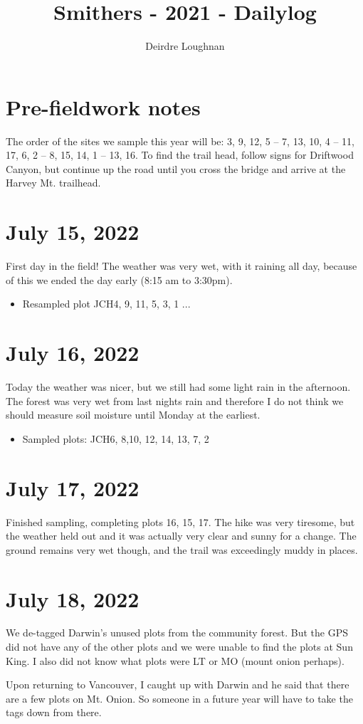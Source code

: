 \documentclass{article}\usepackage[]{graphicx}\usepackage[]{color}
\title{Smithers - 2021 - Dailylog}
\author{Deirdre Loughnan}
\begin{document}
\maketitle
\section{Pre-fieldwork notes}

The order of the sites we sample this year will be:  3,  9, 12, 5  -- 7, 13, 10,  4 -- 11, 17, 6, 2 --  8, 15, 14, 1 -- 13, 16. To find the trail head, follow signs for Driftwood Canyon, but continue up the road until you cross the bridge and arrive at the Harvey Mt. trailhead. 

\section{July 15, 2022}

First day in the field! The weather was very wet, with it raining all day, because of this we ended the day early (8:15 am to 3:30pm).

\begin{itemize}
\item Resampled plot JCH4, 9, 11, 5, 3, 1 ...
\end{itemize}
\section{July 16, 2022}

Today the weather was nicer, but we still had some light rain in the afternoon. The forest was very wet from last nights rain and therefore I do not think we should measure soil moisture until Monday at the earliest.

\begin{itemize}
\item Sampled plots: JCH6, 8,10, 12, 14, 13, 7, 2
\end {itemize}

\section{July 17, 2022}

Finished sampling, completing plots 16, 15, 17. The hike was very tiresome, but the weather held out and it was actually very clear and sunny for a change. The ground remains very wet though, and the trail was exceedingly muddy in places. 

\section{July 18, 2022}

We de-tagged Darwin's unused plots from the community forest. But the GPS did not have any of the other plots and we were unable to find the plots at Sun King. I also did not know what plots were LT or MO (mount onion perhaps).

Upon returning to Vancouver, I caught up with Darwin and he said that there are a few plots on Mt. Onion. So someone in a future year will have to take the tags down from there.
\end{document}
